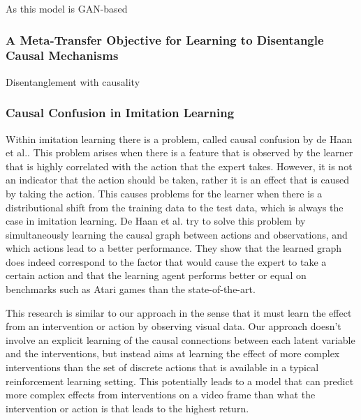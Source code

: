 \documentclass{article}
\begin{document}
As this model is GAN-based

\subsubsection*{A Meta-Transfer Objective for Learning to Disentangle Causal Mechanisms}
Disentanglement with causality \cite{Bengio2020A}

\subsubsection*{Causal Confusion in Imitation Learning}
Within imitation learning\cite{torabi2019recent} there is a problem, called causal confusion by de Haan et al.\cite{de2019causal}. This problem arises when there is a feature that is observed by the learner that is highly correlated with the action that the expert takes. However, it is not an indicator that the action should be taken, rather it is an effect that is caused by taking the action. This causes problems for the learner when there is a distributional shift from the training data to the test data, which is always the case in imitation learning. De Haan et al. try to solve this problem by simultaneously learning the causal graph between actions and observations, and which actions lead to a better performance. They show that the learned graph does indeed correspond to the factor that would cause the expert to take a certain action and that the learning agent performs better or equal on benchmarks such as Atari games than the state-of-the-art. 


This research is similar to our approach in the sense that it must learn the effect from an intervention or action by observing visual data. Our approach doesn't involve an explicit learning of the causal connections between each latent variable and the interventions, but instead aims at learning the effect of more complex interventions than the set of discrete actions that is available in a typical reinforcement learning setting. This potentially leads to a model that can predict more complex effects from interventions on a video frame than what the intervention or action is that leads to the highest return.
\end{document}
